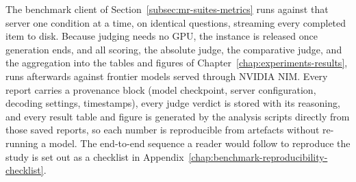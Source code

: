 The benchmark client of Section~\ref{subsec:mr-suites-metrics} runs against that server one condition at a time, on identical questions, streaming every completed item to disk. Because judging needs no GPU, the instance is released once generation ends, and all scoring, the absolute judge, the comparative judge, and the aggregation into the tables and figures of Chapter~\ref{chap:experiments-results}, runs afterwards against frontier models served through NVIDIA NIM.
Every report carries a provenance block (model checkpoint, server configuration, decoding settings, timestamps), every judge verdict is stored with its reasoning, and every result table and figure is generated by the analysis scripts directly from those saved reports, so each number is reproducible from artefacts without re-running a model. The end-to-end sequence a reader would follow to reproduce the study is set out as a checklist in Appendix~\ref{chap:benchmark-reproducibility-checklist}.


%
